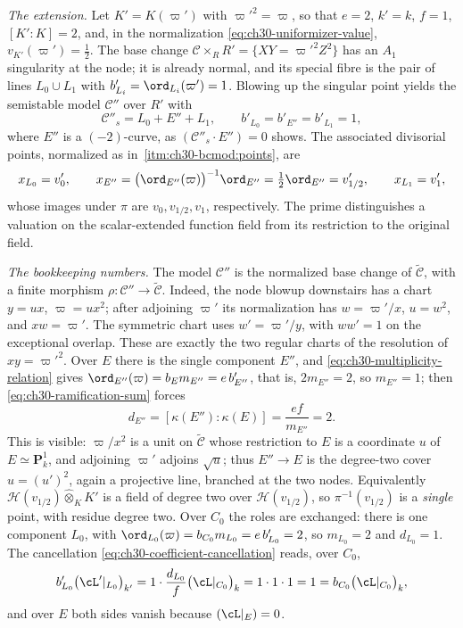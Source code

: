 \begin{example}
\emph{The extension.}  Let $K'=K(\varpi')$ with $\varpi'^2=\varpi$, so
that $e=2$, $k'=k$, $f=1$, $[K':K]=2$, and, in the normalization
\eqref{eq:ch30-uniformizer-value}, $v_{K'}(\varpi')=\tfrac12$.  The base
change $\mathcal C\times_RR'=\{XY=\varpi'^2Z^2\}$ has an $A_1$ singularity at
the node; it is already normal, and its special fibre is the pair of lines
$L_0\cup L_1$ with $b'_{L_i}=\ord_{L_i}(\varpi')=1$.  Blowing up the
singular point yields the semistable model $\mathcal C''$ over $R'$ with
\[
 \mathcal C''_s=L_0+E''+L_1,
 \qquad b'_{L_0}=b'_{E''}=b'_{L_1}=1,
\]
where $E''$ is a $(-2)$-curve, as $(\mathcal C''_s\cdot E'')=0$ shows.  The
associated divisorial points, normalized as in
\,\cref{itm:ch30-bcmod:points}, are
\[
 x_{L_0}=v'_0,\qquad
 x_{E''}=\bigl(\ord_{E''}(\varpi)\bigr)^{-1}\ord_{E''}
        =\tfrac12\ord_{E''}=v'_{1/2},\qquad
 x_{L_1}=v'_1 ,
\]
whose images under $\pi$ are $v_0,v_{1/2},v_1$, respectively.
The prime distinguishes a valuation on the scalar-extended function
field from its restriction to the original field.

\emph{The bookkeeping numbers.}  The model $\mathcal C''$ is the normalized base change of
$\widetilde{\mathcal C}$, with a finite morphism
$\rho:\mathcal C''\to\widetilde{\mathcal C}$.
Indeed, the node blowup downstairs has a chart
$y=ux$, $\varpi=ux^2$; after adjoining $\varpi'$ its normalization
has $w=\varpi'/x$, $u=w^2$, and $xw=\varpi'$.
The symmetric chart uses $w'=\varpi'/y$, with $ww'=1$ on the
exceptional overlap.  These are exactly the two regular charts of
the resolution of $xy=\varpi'^2$.
Over $E$ there is the single component $E''$, and
\eqref{eq:ch30-multiplicity-relation} gives
$\ord_{E''}(\varpi)=b_Em_{E''}=e\,b'_{E''}$, that is,
$2m_{E''}=2$, so $m_{E''}=1$; then
\eqref{eq:ch30-ramification-sum} forces
\[
 d_{E''}=[\kappa(E''):\kappa(E)]=\frac{ef}{m_{E''}}=2 .
\]
This is visible: $\varpi/x^2$ is a unit on $\widetilde{\mathcal C}$ whose
restriction to $E$ is a coordinate $u$ of $E\simeq\mathbf P^1_k$, and
adjoining $\varpi'$ adjoins $\sqrt u$; thus $E''\to E$ is the
degree-two cover $u=(u')^2$, again a projective line, branched at the two
nodes.  Equivalently $\mathcal H(v_{1/2})\widehat\otimes_KK'$ is a field
of degree two over $\mathcal H(v_{1/2})$, so
$\pi^{-1}(v_{1/2})$ is a \emph{single} point, with residue degree two.
Over $C_0$ the roles are exchanged: there is one component $L_0$, with
$\ord_{L_0}(\varpi)=b_{C_0}m_{L_0}=e\,b'_{L_0}=2$, so $m_{L_0}=2$ and
$d_{L_0}=1$.  The cancellation
\eqref{eq:ch30-coefficient-cancellation} reads, over $C_0$,
\[
 b'_{L_0}\bigl(\cL'|_{L_0}\bigr)_{k'}
 =1\cdot\frac{d_{L_0}}{f}\bigl(\cL|_{C_0}\bigr)_k
 =1\cdot1\cdot1=1=b_{C_0}\bigl(\cL|_{C_0}\bigr)_k ,
\]
and over $E$ both sides vanish because $(\cL|_E)=0$.


\end{example}
